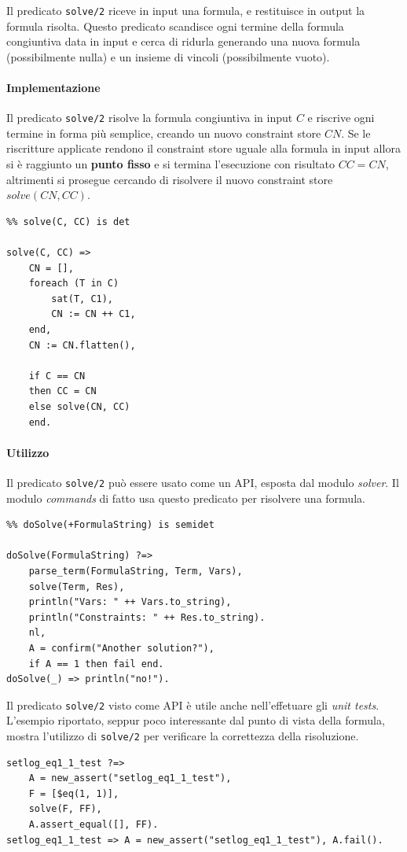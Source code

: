 \documentclass[12pt,a4paper,openright]{book} %
\begin{document}
Il predicato \verb|solve/2| riceve in input una formula, e restituisce in output la formula risolta. Questo predicato scandisce ogni termine della formula congiuntiva data in input e cerca di ridurla generando una nuova formula (possibilmente nulla) e un insieme di vincoli (possibilmente vuoto).

\paragraph{Implementazione} Il predicato \verb|solve/2| risolve la formula congiuntiva in input $C$ e riscrive ogni termine in forma più semplice, creando un nuovo constraint store $CN$. Se le riscritture applicate rendono il constraint store uguale alla formula in input allora si è raggiunto un \textbf{punto fisso} e si termina l'esecuzione con risultato $CC = CN$, altrimenti si prosegue cercando di risolvere il nuovo constraint store $solve(CN, CC)$.
\begin{verbatim}
%% solve(C, CC) is det

solve(C, CC) =>
    CN = [],
    foreach (T in C)
        sat(T, C1), 
        CN := CN ++ C1,
    end,
    CN := CN.flatten(),
   
    if C == CN 
    then CC = CN 
    else solve(CN, CC)
    end.
\end{verbatim}

\paragraph{Utilizzo} Il predicato \verb|solve/2| può essere usato come un API, esposta dal modulo \emph{solver}. Il modulo \emph{commands} di fatto usa questo predicato per risolvere una formula.
\begin{verbatim}
%% doSolve(+FormulaString) is semidet

doSolve(FormulaString) ?=>
    parse_term(FormulaString, Term, Vars),
    solve(Term, Res),
    println("Vars: " ++ Vars.to_string),
    println("Constraints: " ++ Res.to_string).
    nl,
    A = confirm("Another solution?"),
    if A == 1 then fail end.
doSolve(_) => println("no!").
\end{verbatim}

Il predicato \verb|solve/2| visto come API è utile anche nell'effetuare gli \emph{unit tests}. L'esempio riportato, seppur poco interessante dal punto di vista della formula, mostra l'utilizzo di \verb|solve/2| per verificare la correttezza della risoluzione.
\begin{verbatim}
setlog_eq1_1_test ?=>
    A = new_assert("setlog_eq1_1_test"),
    F = [$eq(1, 1)],
    solve(F, FF),
    A.assert_equal([], FF).
setlog_eq1_1_test => A = new_assert("setlog_eq1_1_test"), A.fail().
\end{verbatim}
\end{document}
